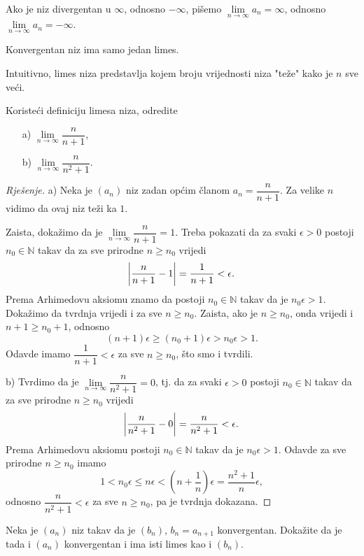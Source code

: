 Ako je niz divergentan u $\mathbb{\infty}$, odnosno $-\mathbb{\infty}$, pišemo $\lim\limits_{n\to \infty}{a_n}=\infty$, odnosno $\lim\limits_{n\to \infty}{a_n}=-\infty$.
\begin{remark}
Konvergentan niz ima samo jedan limes.
\end{remark}

Intuitivno, limes niza predstavlja kojem broju vrijednosti niza "teže" kako je $n$ sve veći.

\begin{exercise}
Koristeći definiciju limesa niza, odredite
\begin{itemize}
\item[a)] $\lim\limits_{n\to \infty}{\dfrac{n}{n+1}}$,
\item[b)] $\lim\limits_{n\to \infty}{\dfrac{n}{n^2+1}}$.
\end{itemize}
\end{exercise}
\begin{proof}[Rješenje]
a) Neka je $(a_n)$ niz zadan općim članom $a_n=\dfrac{n}{n+1}$. Za velike $n$ vidimo da ovaj niz teži ka $1$. 

Zaista, dokažimo da je $\lim\limits_{n\to \infty}{\dfrac{n}{n+1}}=1$. Treba pokazati da za svaki $\epsilon>0$ postoji $n_0\in \mathbb{N}$ takav da za sve prirodne $n\geq n_0$ vrijedi
$$\abs{\dfrac{n}{n+1}-1}=\dfrac{1}{n+1}<\epsilon.$$ Prema Arhimedovu aksiomu znamo da postoji $n_0\in \mathbb{N}$ takav da je $n_0\epsilon>1$. Dokažimo da tvrdnja vrijedi i za sve $n\geq n_0$. Zaista, ako je $n\geq n_0$, onda vrijedi i $n+1\geq n_0+1$, odnosno $$(n+1)\epsilon\geq(n_0+1)\epsilon>n_0\epsilon>1.$$ 
Odavde imamo $\dfrac{1}{n+1}<\epsilon$ za sve $n\geq n_0$, što smo i tvrdili.

b) Tvrdimo da je $\lim\limits_{n\to \infty}{\dfrac{n}{n^2+1}}=0$, tj. da za svaki $\epsilon>0$ postoji $n_0\in \mathbb{N}$ takav da za sve prirodne $n\geq n_0$ vrijedi
$$\abs{\dfrac{n}{n^2+1}-0}=\dfrac{n}{n^2+1}<\epsilon.$$
Prema Arhimedovu aksiomu postoji $n_0\in \mathbb{N}$ takav da je $n_0\epsilon>1$. Odavde za sve prirodne $n\geq n_0$ imamo
$$1<n_0\epsilon\leq n\epsilon<\left(n+\dfrac{1}{n}\right)\epsilon=\dfrac{n^2+1}{n}\epsilon,$$
odnosno $\dfrac{n}{n^2+1}<\epsilon$ za sve $n\geq n_0$, pa je tvrdnja dokazana.
\end{proof}
\begin{exercise}
\label{41}
Neka je $(a_n)$ niz takav da je $(b_n)$, $b_n=a_{n+1}$ konvergentan. Dokažite da je tada i $(a_n)$ konvergentan i ima isti limes kao i $(b_n)$.
\end{exercise}
